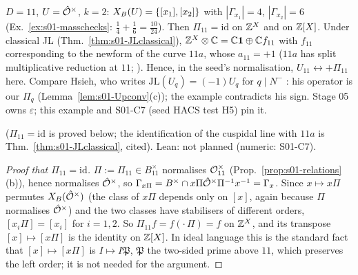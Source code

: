 \begin{example}\label{ex:s01-Pi11}
$D=11$, $U=\hat{\mathcal{O}}^\times$, $k=2$: $X_B(U)=\{[x_1],[x_2]\}$ with $|\Gamma_{x_1}|=4$, $|\Gamma_{x_2}|=6$ (Ex.~\ref{ex:s01-masschecks}:
$\frac14+\frac16=\frac{10}{24}$). Then $\Pi_{11}=\mathrm{id}$ on $\mathbb{Z}^X$ and on $\mathbb{Z}[X]$. Under classical JL
(Thm.~\ref{thm:s01-JLclassical}), $\mathbb{Z}^X\otimes\mathbb{C}=\mathbb{C}\mathbf 1\oplus\mathbb{C} f_{11}$ with $f_{11}$ corresponding to the newform of the curve $11a$, whose
$a_{11}=+1$ ($11a$ has split multiplicative reduction at $11$; \stknown). Hence, in the seed's normalisation, $U_{11}\leftrightarrow+\Pi_{11}$
here. Compare Hsieh, who writes $\mathrm{JL}(U_q)=(-1)U_q$ for $q\mid N^-$
: his operator is our $\Pi_q$
(Lemma~\ref{lem:s01-Upconv}(c)); the example contradicts his sign.
Stage 05 owns $\varepsilon$; this example and S01-C7 (seed HACS test H5) pin it.
\end{example}
\noindent\stpmc{} ($\Pi_{11}=\mathrm{id}$ is proved below; the identification of the cuspidal line with $11a$ is
Thm.~\ref{thm:s01-JLclassical}, cited). Lean: not planned (numeric: S01-C7).
\begin{proof}[Proof that $\Pi_{11}=\mathrm{id}$]
$\Pi:=\Pi_{11}\in B_{11}^\times$ normalises $\mathcal{O}_{11}^\times$ (Prop.~\ref{prop:s01-relations}(b)), hence normalises $\hat{\mathcal{O}}^\times$, so
$\Gamma_{x\Pi}=B^\times\cap x\Pi\hat{\mathcal{O}}^\times\Pi^{-1}x^{-1}=\Gamma_x$. Since $x\mapsto x\Pi$ permutes $X_B(\hat{\mathcal{O}}^\times)$ (the class of $x\Pi$ depends only on
$[x]$, again because $\Pi$ normalises $\hat{\mathcal{O}}^\times$) and the two classes have stabilisers of different orders, $[x_i\Pi]=[x_i]$ for $i=1,2$. So
$\Pi_{11}f=f(\cdot\,\Pi)=f$ on $\mathbb{Z}^X$, and its transpose $[x]\mapsto[x\Pi]$ is the identity on $\mathbb{Z}[X]$. In ideal language this is the standard
fact that $[x]\mapsto[x\Pi]$ is $I\mapsto I\mathfrak P$, $\mathfrak P$ the two-sided prime above $11$, which preserves the left order; it is not needed for
the argument.
\end{proof}
